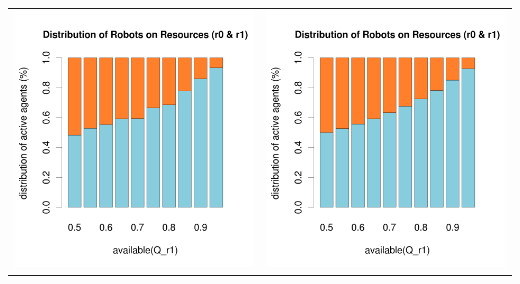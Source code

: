 \documentclass[a4paper,10pt]{article}
\begin{document}
\begin{table}[H]
\begin{tabular}{cc}
\includegraphics[width=\imgSize]{../images/5StaticEnv/barplotAliveR1AndR2_mean_env2_normalized}& \includegraphics[width=\imgSize]{../images/5StaticEnv/barplotAliveR1AndR2_median_env2_normalized}
\end{tabular} 
\end{table}
\end{document}
